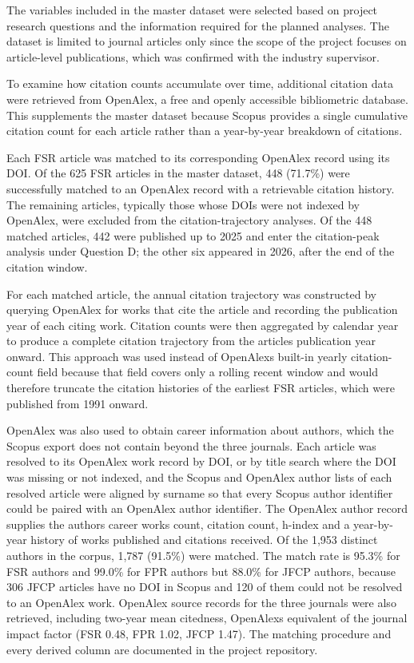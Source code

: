 \documentclass[11pt,a4paper]{article}
\begin{document}
The variables included in the master dataset were selected based on project research questions and the information required for the planned analyses. The dataset is limited to journal articles only since the scope of the project focuses on article-level publications, which was confirmed with the industry supervisor.

To examine how citation counts accumulate over time, additional citation data were retrieved from OpenAlex, a free and openly accessible bibliometric database. This supplements the master dataset because Scopus provides a single cumulative citation count for each article rather than a year-by-year breakdown of citations.

Each FSR article was matched to its corresponding OpenAlex record using its DOI. Of the 625 FSR articles in the master dataset, 448 (71.7\%) were successfully matched to an OpenAlex record with a retrievable citation history. The remaining articles, typically those whose DOIs were not indexed by OpenAlex, were excluded from the citation-trajectory analyses. Of the 448 matched articles, 442 were published up to 2025 and enter the citation-peak analysis under Question D; the other six appeared in 2026, after the end of the citation window.

For each matched article, the annual citation trajectory was constructed by querying OpenAlex for works that cite the article and recording the publication year of each citing work. Citation counts were then aggregated by calendar year to produce a complete citation trajectory from the article\textquotesingle s publication year onward. This approach was used instead of OpenAlex\textquotesingle s built-in yearly citation-count field because that field covers only a rolling recent window and would therefore truncate the citation histories of the earliest FSR articles, which were published from 1991 onward.

OpenAlex was also used to obtain career information about authors, which the Scopus export does not contain beyond the three journals. Each article was resolved to its OpenAlex work record by DOI, or by title search where the DOI was missing or not indexed, and the Scopus and OpenAlex author lists of each resolved article were aligned by surname so that every Scopus author identifier could be paired with an OpenAlex author identifier. The OpenAlex author record supplies the author\textquotesingle s career works count, citation count, h-index and a year-by-year history of works published and citations received. Of the 1,953 distinct authors in the corpus, 1,787 (91.5\%) were matched. The match rate is 95.3\% for FSR authors and 99.0\% for FPR authors but 88.0\% for JFCP authors, because 306 JFCP articles have no DOI in Scopus and 120 of them could not be resolved to an OpenAlex work. OpenAlex source records for the three journals were also retrieved, including two-year mean citedness, OpenAlex\textquotesingle s equivalent of the journal impact factor (FSR 0.48, FPR 1.02, JFCP 1.47). The matching procedure and every derived column are documented in the project repository.
\end{document}
